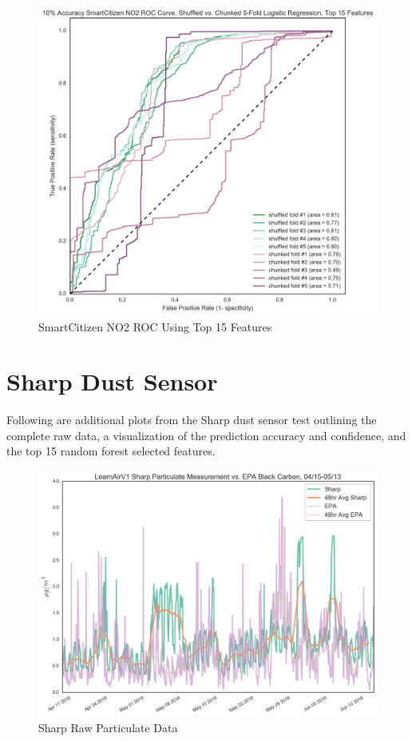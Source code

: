 \begin{figure}[htb]
 	\includegraphics[width=\textwidth]{figs/sck_no2_10_roc_pruned_features}               
 	 \caption{SmartCitizen NO2 ROC Using Top 15 Features}
  	\label{fig:sck_no2_10_roc_pruned_features}
\end{figure}


\FloatBarrier
\section{Sharp Dust Sensor}
\FloatBarrier

Following are additional plots from the Sharp dust sensor test outlining the complete raw data, a visualization of the prediction accuracy and confidence, and the top 15 random forest selected features.

\begin{figure}[htb]
 	\includegraphics[width=\textwidth]{figs/sharp_raw}               
 	 \caption{Sharp Raw Particulate Data}
  	\label{fig:sharp_raw}
\end{figure}


